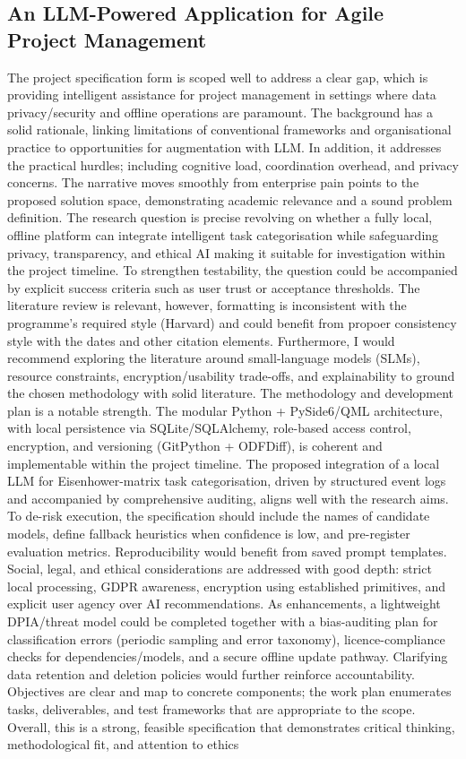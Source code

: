 \documentclass{report}
\begin{document}
\subsection{An LLM-Powered Application for Agile Project Management}
The project specification form is scoped well to address a clear gap, which is providing 
intelligent assistance for project management in settings where data privacy/security and 
offline operations are paramount. The background has a solid rationale, linking limitations of 
conventional frameworks and organisational practice to opportunities for augmentation with 
LLM. In addition, it addresses the practical hurdles; including cognitive load, coordination 
overhead, and privacy concerns. The narrative moves smoothly from enterprise pain points 
to the proposed solution space, demonstrating academic relevance and a sound problem 
definition. The research question is precise revolving on whether a fully local, offline 
platform can integrate intelligent task categorisation while safeguarding privacy, 
transparency, and ethical AI making it suitable for investigation within the project timeline. To 
strengthen testability, the question could be accompanied by explicit success criteria such as
user trust or acceptance thresholds.
The literature review is relevant, however, formatting is inconsistent with the programme’s 
required style (Harvard) and could benefit from propoer consistency style with the dates and 
other citation elements. Furthermore, I would recommend exploring the literature around 
small-language models (SLMs), resource constraints, encryption/usability trade-offs, and 
explainability to ground the chosen methodology with solid literature.
The methodology and development plan is a notable strength. The modular Python + 
PySide6/QML architecture, with local persistence via SQLite/SQLAlchemy, role-based 
access control, encryption, and versioning (GitPython + ODFDiff), is coherent and 
implementable within the project timeline. The proposed integration of a local LLM for 
Eisenhower-matrix task categorisation, driven by structured event logs and accompanied by 
comprehensive auditing, aligns well with the research aims. To de-risk execution, the 
specification should include the names of candidate models, define fallback heuristics when 
confidence is low, and pre-register evaluation metrics. Reproducibility would benefit from
saved prompt templates.
Social, legal, and ethical considerations are addressed with good depth: strict local 
processing, GDPR awareness, encryption using established primitives, and explicit user 
agency over AI recommendations. As enhancements, a lightweight DPIA/threat model could
be completed together with a bias-auditing plan for classification errors (periodic sampling 
and error taxonomy), licence-compliance checks for dependencies/models, and a secure 
offline update pathway. Clarifying data retention and deletion policies would further reinforce 
accountability.
Objectives are clear and map to concrete components; the work plan enumerates tasks, 
deliverables, and test frameworks that are appropriate to the scope. Overall, this is a strong, 
feasible specification that demonstrates critical thinking, methodological fit, and attention to 
ethics
\end{document}

